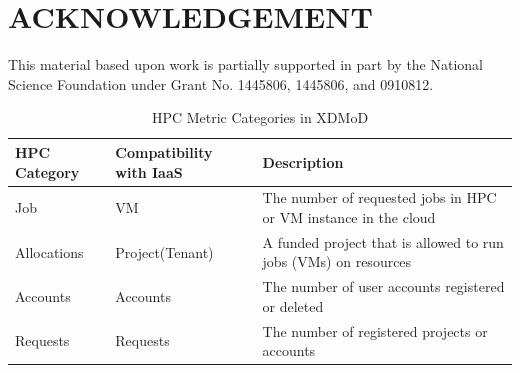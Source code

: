 \documentclass{sig-alternate-05-2015}
\begin{document}
\section{ACKNOWLEDGEMENT} 
 
This material based upon work is partially supported in part by the National Science Foundation under Grant No. 1445806, 1445806, and 0910812.


\begin{scriptsize} 
 
% 

\end{scriptsize}
   
 
\begin{table}[htb]
  \caption{HPC Metric Categories in XDMoD}
\begin{scriptsize}
\label{T:xdmod}
 \begin{tabular}{l|l|l} 
HPC Category & Compatibility with IaaS & Description\\
\hline
Job & VM & The number of requested jobs in HPC or VM instance in the cloud\\
Allocations & Project(Tenant) & A funded project that is allowed to run jobs (VMs) on resources \\
Accounts & Accounts & The number of user accounts registered or deleted \\
Requests & Requests & The number of registered projects or accounts\\
\hline
\end{tabular}\\
\end{scriptsize}
\end{table}
\end{document}
